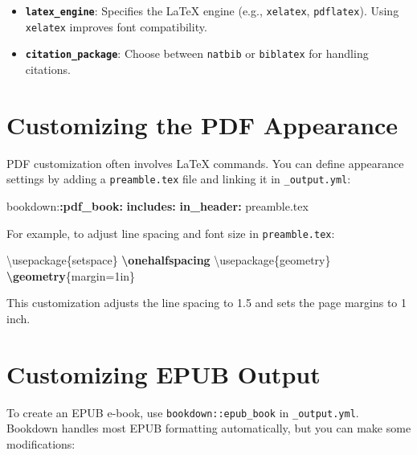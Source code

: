 \documentclass[
]{book}
\newenvironment{Shaded}{\begin{snugshade}}{\end{snugshade}}
\newcommand{\AttributeTok}[1]{\textcolor[rgb]{0.13,0.29,0.53}{#1}}
\newcommand{\BuiltInTok}[1]{#1}
\newcommand{\ExtensionTok}[1]{#1}
\newcommand{\FunctionTok}[1]{\textcolor[rgb]{0.13,0.29,0.53}{\textbf{#1}}}
\newcommand{\KeywordTok}[1]{\textcolor[rgb]{0.13,0.29,0.53}{\textbf{#1}}}
\newcommand{\NormalTok}[1]{#1}
\providecommand{\tightlist}{%
  \setlength{\itemsep}{0pt}\setlength{\parskip}{0pt}}
\theoremstyle{definition}
\theoremstyle{definition}
\theoremstyle{definition}
\theoremstyle{definition}
\theoremstyle{remark}
\begin{document}
\begin{itemize}
\tightlist
\item
  \textbf{\texttt{latex\_engine}}: Specifies the LaTeX engine (e.g., \texttt{xelatex}, \texttt{pdflatex}). Using \texttt{xelatex} improves font compatibility.
\item
  \textbf{\texttt{citation\_package}}: Choose between \texttt{natbib} or \texttt{biblatex} for handling citations.
\end{itemize}

\section{Customizing the PDF Appearance}\label{customizing-the-pdf-appearance}

PDF customization often involves LaTeX commands. You can define appearance settings by adding a \texttt{preamble.tex} file and linking it in \texttt{\_output.yml}:

\begin{Shaded}
\begin{Highlighting}[]
\AttributeTok{bookdown:}\FunctionTok{:pdf\_book}\KeywordTok{:}
\AttributeTok{  }\FunctionTok{includes}\KeywordTok{:}
\AttributeTok{    }\FunctionTok{in\_header}\KeywordTok{:}\AttributeTok{ preamble.tex}
\end{Highlighting}
\end{Shaded}

For example, to adjust line spacing and font size in \texttt{preamble.tex}:

\begin{Shaded}
\begin{Highlighting}[]
\BuiltInTok{\textbackslash{}usepackage}\NormalTok{\{}\ExtensionTok{setspace}\NormalTok{\}}
\FunctionTok{\textbackslash{}onehalfspacing}
\BuiltInTok{\textbackslash{}usepackage}\NormalTok{\{}\ExtensionTok{geometry}\NormalTok{\}}
\FunctionTok{\textbackslash{}geometry}\NormalTok{\{margin=1in\}}
\end{Highlighting}
\end{Shaded}

This customization adjusts the line spacing to 1.5 and sets the page margins to 1 inch.

\section{Customizing EPUB Output}\label{customizing-epub-output}

To create an EPUB e-book, use \texttt{bookdown::epub\_book} in \texttt{\_output.yml}. Bookdown handles most EPUB formatting automatically, but you can make some modifications:
\end{document}
